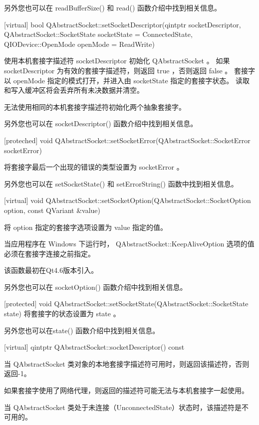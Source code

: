 另外您也可以在 readBufferSize() 和 read() 函数介绍中找到相关信息。

[virtual] bool QAbstractSocket::setSocketDescriptor(qintptr
socketDescriptor, QAbstractSocket::SocketState socketState =
ConnectedState, QIODevice::OpenMode openMode = ReadWrite)

使用本机套接字描述符 socketDescriptor 初始化 QAbstractSocket 。 如果 socketDescriptor 为有效的套接字描述符，则返回 true ，否则返回 false 。 套接字以 openMode 指定的模式打开，并进入由 socketState 指定的套接字状态。 读取和写入缓冲区将会丢弃所有未决数据并清空。

\begin{notice}
 无法使用相同的本机套接字描述符初始化两个抽象套接字。
\end{notice}

另外您也可以在 socketDescriptor() 函数介绍中找到相关信息。

[proteched] void
QAbstractSocket::setSocketError(QAbstractSocket::SocketError
socketError)

将套接字最后一个出现的错误的类型设置为 socketError 。

另外您也可以在 setSocketState() 和 setErrorString() 函数中找到相关信息。

[virtual] void
QAbstractSocket::setSocketOption(QAbstractSocket::SocketOption option,
const QVariant \&value)

将 option 指定的套接字选项设置为 value 指定的值。

\begin{notice}
当应用程序在 Windows 下运行时， QAbstractSocket::KeepAliveOption 选项的值必须在套接字连接之前指定。
\end{notice}

该函数最初在Qt4.6版本引入。

另外您也可以在 socketOption() 函数介绍中找到相关信息。

[protected] void QAbstractSocket::setSocketState(QAbstractSocket::SocketState state)
将套接字的状态设置为 state 。

另外您也可以在state() 函数介绍中找到相关信息。

[virtual] qintptr QAbstractSocket::socketDescriptor() const

当 QAbstractSocket 类对象的本地套接字描述符可用时，则返回该描述符，否则返回-1。

如果套接字使用了网络代理，则返回的描述符可能无法与本机套接字一起使用。

当 QAbstractSocket 类处于未连接（UnconnectedState）状态时，该描述符是不可用的。

